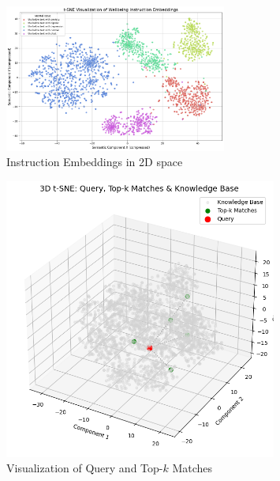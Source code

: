 \begin{figure}[H]
    \centering
    \includegraphics[width=0.65\textwidth]{Images/RAG_WBEMBED.png}
    \caption*{Instruction Embeddings in 2D space}
    \label{fig:wellbeing_questions}
\end{figure}

\pagebreak

\begin{figure}[H]
    \centering
    \includegraphics[width=0.8\textwidth]{Images/RAG_KNOWLEDGE.png}
    \caption*{Visualization of Query and Top-\(k\) Matches}
    \label{fig:wellbeing_questions}
\end{figure}


